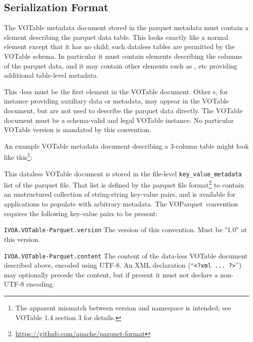 \documentclass[11pt,a4paper]{ivoa}
\newcommand{\voparquet}{VOParquet}
\begin{document}
\subsection{Serialization Format}
\label{sec:format}

The VOTable metadata document stored in the parquet metadata
must contain a  element describing the parquet data table.
This looks exactly like a normal  element
except that it has no  child;
such dataless tables are permitted by the VOTable schema.
In particular it must contain  elements describing the
columns of the parquet data,
and it may contain other elements such as ,  etc
providing additional table-level metadata.
 
This -less  must be the first
 element in the VOTable document.
Other s,
for instance providing auxiliary data or metadata,
may appear in the VOTable document,
but are not used to describe the parquet data directly.
The VOTable document must be a schema-valid and legal VOTable instance.
No particular VOTable version is mandated by this convention.

An example VOTable metadata document describing a 3-column table
might look like this\footnote{
  The apparent mismatch between version and namespace is intended;
  see VOTable 1.4 section 3 for details.}:


This dataless VOTable document is stored in the file-level
{\tt key\_value\_metadata} list of the parquet file.
That list is defined by the parquet file
format\footnote{\url{https://github.com/apache/parquet-format}}
to contain an unstructured collection of string-string key-value pairs,
and is available for applications to populate with arbitrary metadata.
The \voparquet\ convention requires the following key-value pairs
to be present:
\begin{bigdescription}
\item[{\tt IVOA.VOTable-Parquet.version}]
   The version of this convention.  Must be "1.0" at this version.
\item[{\tt IVOA.VOTable-Parquet.content}]
   The content of the data-less VOTable document described above,
   encoded using UTF-8.
   An XML declaration (``\verb|<?xml ... ?>|'') may optionally
   precede the content,
   but if present it must not declare a non-UTF-8 encoding.
\end{bigdescription}
\end{document}
